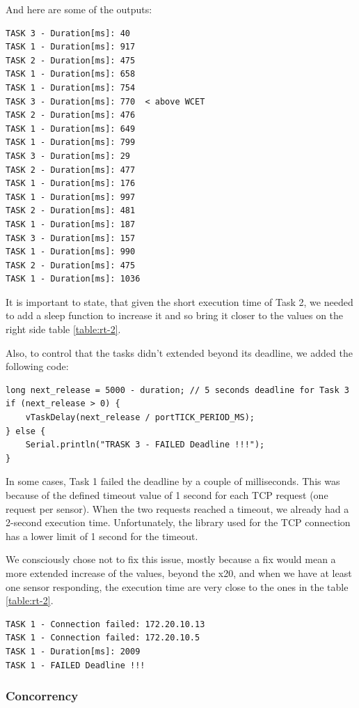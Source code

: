 \documentclass[11pt]{article}
\begin{document}
\noindent
And here are some of the outputs:

\begin{verbatim}
TASK 3 - Duration[ms]: 40
TASK 1 - Duration[ms]: 917
TASK 2 - Duration[ms]: 475
TASK 1 - Duration[ms]: 658
TASK 1 - Duration[ms]: 754
TASK 3 - Duration[ms]: 770  < above WCET
TASK 2 - Duration[ms]: 476
TASK 1 - Duration[ms]: 649
TASK 1 - Duration[ms]: 799
TASK 3 - Duration[ms]: 29
TASK 2 - Duration[ms]: 477
TASK 1 - Duration[ms]: 176
TASK 1 - Duration[ms]: 997
TASK 2 - Duration[ms]: 481
TASK 1 - Duration[ms]: 187
TASK 3 - Duration[ms]: 157
TASK 1 - Duration[ms]: 990
TASK 2 - Duration[ms]: 475
TASK 1 - Duration[ms]: 1036
\end{verbatim}

It is important to state, that given the short execution time of Task 2, we needed to add a sleep function to increase it and so bring it closer to the values on the right side table \ref{table:rt-2}.

Also, to control that the tasks didn't extended beyond its deadline, we added the following code:

\begin{verbatim}
long next_release = 5000 - duration; // 5 seconds deadline for Task 3
if (next_release > 0) {
    vTaskDelay(next_release / portTICK_PERIOD_MS);
} else {
    Serial.println("TRASK 3 - FAILED Deadline !!!");
}
\end{verbatim}

In some cases, Task 1 failed the deadline by a couple of milliseconds. This was because of the defined timeout value of 1 second for each TCP request (one request per sensor). When the two requests reached a timeout, we already had a 2-second execution time. Unfortunately, the library used for the TCP connection has a lower limit of 1 second for the timeout. 

We consciously chose not to fix this issue, mostly because a fix would mean a more extended increase of the values, beyond the x20, and when we have at least one sensor responding, the execution time are very close to the ones in the table \ref{table:rt-2}.

\begin{verbatim}
TASK 1 - Connection failed: 172.20.10.13
TASK 1 - Connection failed: 172.20.10.5
TASK 1 - Duration[ms]: 2009
TASK 1 - FAILED Deadline !!!
\end{verbatim}

\subsubsection{Concorrency}
\end{document}
